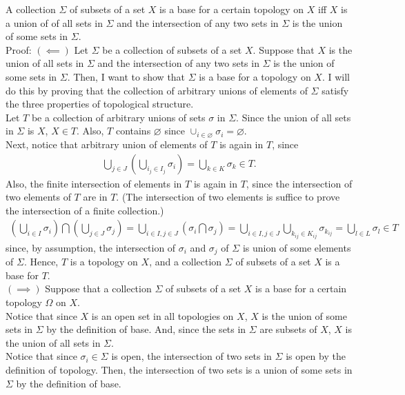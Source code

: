 \documentclass[document]{article}
\begin{document}
\begin{problem}[3.B] A collection $\Sigma$ of subsets of a set $X$ is a base for a certain topology on $X$ iff $X$ is a union of of all sets in $\Sigma$ and the intersection of any two sets in $\Sigma$ is the union of some sets in $\Sigma$.\\

\noindent Proof: $(\impliedby)$ Let $\Sigma$ be a collection of subsets of a set $X$. Suppose that $X$ is the union of all sets in $\Sigma$ and the intersection of any two sets in $\Sigma$ is the union of some sets in $\Sigma$. Then, I want to show that $\Sigma$ is a base for a topology on $X$. I will do this by proving that the collection of arbitrary unions of elements of $\Sigma$ satisfy the three properties of topological structure.\\

\noindent Let $T$ be a collection of arbitrary unions of sets $\sigma$ in $\Sigma$. Since the union of all sets in $\Sigma$ is $X$, $X\in T$. Also, $T$ contains $\varnothing$ since $\cup_{i\in \varnothing} \sigma_i = \varnothing$.\\

\noindent Next, notice that arbitrary union of elements of $T$ is again in $T$, since 
\begin{align}
    \bigcup_{j\in J}\left(\bigcup_{i_j\in I_j} \sigma_i \right) = \bigcup_{k \in K} \sigma_k \in T.
\end{align}
Also, the finite intersection of elements in $T$ is again in $T$, since the intersection of two elements of $T$ are in $T$. (The intersection of two elements is suffice to prove the intersection of a finite collection.)
\begin{align}
    \left( \bigcup_{i\in I} \sigma_{i}\right) \bigcap \left( \bigcup_{j\in J} \sigma_{j}\right) 
    = \bigcup_{i\in I, j\in J} \left( \sigma_{i} \bigcap \sigma_{j} \right) = \bigcup_{i\in I, j\in J} \bigcup_{k_{ij}\in K_{ij}} \sigma_{k_{ij}} = \bigcup_{l\in L} \sigma_l \in T
\end{align}
since, by assumption, the intersection of $\sigma_i$ and $\sigma_j$ of $\Sigma$ is union of some elements of $\Sigma$. Hence, $T$ is a topology on $X$, and a collection $\Sigma$ of subsets of a set $X$ is a base for $T$.\\

\noindent $(\implies)$ Suppose that a collection $\Sigma$ of subsets of a set $X$ is a base for a certain topology $\Omega$ on $X$. \\

\noindent Notice that since $X$ is an open set in all topologies on $X$, $X$ is the union of some sets in $\Sigma$ by the definition of base. And, since the sets in $\Sigma$ are subsets of $X$, $X$ is the union of all sets in $\Sigma$.\\

\noindent Notice that since $\sigma_i \in \Sigma$ is open, the intersection of two sets in $\Sigma$ is open by the definition of topology. Then, the intersection of two sets is a union of some sets in $\Sigma$ by the definition of base. 

\end{problem}
\end{document}
